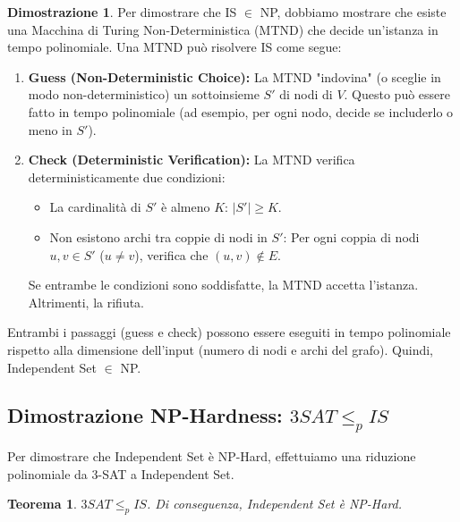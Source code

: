 \documentclass[a4paper, 11pt]{book} %
\newtheorem{theorem}{Teorema}[section]
\theoremstyle{definition}
\newtheorem*{proof*}{Dimostrazione}
\begin{document}
\begin{proof*}
Per dimostrare che IS $\in$ NP, dobbiamo mostrare che esiste una Macchina di Turing Non-Deterministica (MTND) che decide un'istanza in tempo polinomiale.
Una MTND può risolvere IS come segue:
\begin{enumerate}
    \item \textbf{Guess (Non-Deterministic Choice):} La MTND "indovina" (o sceglie in modo non-deterministico) un sottoinsieme $S'$ di nodi di $V$. Questo può essere fatto in tempo polinomiale (ad esempio, per ogni nodo, decide se includerlo o meno in $S'$).
    \item \textbf{Check (Deterministic Verification):} La MTND verifica deterministicamente due condizioni:
    \begin{itemize}
        \item La cardinalità di $S'$ è almeno $K$: $|S'| \ge K$.
        \item Non esistono archi tra coppie di nodi in $S'$: Per ogni coppia di nodi $u, v \in S'$ ($u \ne v$), verifica che $(u, v) \notin E$.
    \end{itemize}
    Se entrambe le condizioni sono soddisfatte, la MTND accetta l'istanza. Altrimenti, la rifiuta.
\end{enumerate}
Entrambi i passaggi (guess e check) possono essere eseguiti in tempo polinomiale rispetto alla dimensione dell'input (numero di nodi e archi del grafo). Quindi, Independent Set $\in$ NP.
\end{proof*}

\subsection{Dimostrazione NP-Hardness: $3SAT \le_p IS$}

Per dimostrare che Independent Set è NP-Hard, effettuiamo una riduzione polinomiale da 3-SAT a Independent Set.

\begin{theorem}
$3SAT \le_p IS$. Di conseguenza, \emph{Independent Set} è NP-Hard.
\end{theorem}
\end{document}
